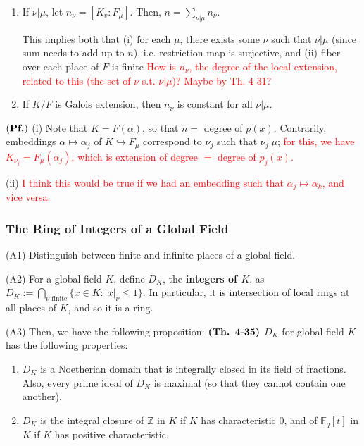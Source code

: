 \documentclass{article}
\begin{document}
\begin{enumerate}
    \item If $\nu | \mu$, let $n_{\nu} = [K_v:F_\mu]$. Then, $n = \sum_{\nu | \mu}n_{\nu}$.
    
    This implies both that (i) for each $\mu$, there exists some $\nu$ such that $\nu | \mu$ (since sum needs to add up to $n$), i.e. restriction map is surjective, and (ii) fiber over each place of $F$ is finite \textcolor{red}{How is $n_{\nu}$, the degree of the local extension, related to this (the set of $\nu$ s.t. $\nu|\mu$)? Maybe by Th. 4-31?} 
    \item If $K/F$ is Galois extension, then $n_{\nu}$ is constant for all $\nu | \mu$.
\end{enumerate}

$(\textbf{Pf.})$ (i) Note that $K = F(\alpha)$, so that $n = $ degree of $p(x)$. Contrarily, embeddings $ \alpha \mapsto \alpha_j$ of $K \hookrightarrow \bar{F}_{\mu}$ correspond to $\nu_j$ such that $\nu_j | \mu$; \textcolor{red}{for this, we have $K_{\nu_j} = F_{\mu}(\alpha_j)$, which is extension of degree $=$ degree of $p_j(x)$.}

(ii) \textcolor{red}{I think this would be true if we had an embedding such that $\alpha_j \mapsto \alpha_k$, and vice versa.}

\subsubsection*{The Ring of Integers of a Global Field}

(A1) Distinguish between finite and infinite places of a global field.

(A2) For a global field $K$, define $D_K$, the \textbf{integers of $K$}, as $D_K := \bigcap_{\nu \text{ finite}} \{x \in K:|x|_{\nu} \leq 1 \}$. In particular, it is intersection of local rings at all places of $K$, and so it is a ring.

(A3) Then, we have the following proposition:
$\textbf{(Th. 4-35)}$ $D_K$ for global field $K$ has the following properties:
\begin{enumerate}
    \item $D_K$ is a Noetherian domain that is integrally closed in its field of fractions. Also, every prime ideal of $D_K$ is maximal (so that they cannot contain one another).
    \item $D_K$ is the integral closure of $\mathbb{Z}$ in $K$ if $K$ has characteristic $0$, and of $\mathbb{F}_q[t]$ in $K$ if $K$ has positive characteristic.
\end{enumerate}
\end{document}
